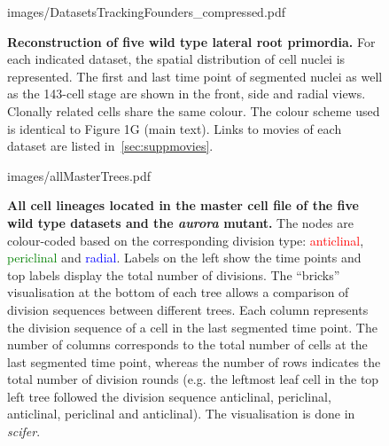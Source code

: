 \documentclass[11pt,a4paper, final]{article}
\begin{document}
%
%
\clearpage
\begin{figure}[htbp]
\centering
	\begin{overpic}[width=1.\linewidth]{images/DatasetsTrackingFounders_compressed.pdf}
	\end{overpic}
\caption[Reconstruction of five wild type lateral root primordia.]
{{\bf Reconstruction of five wild type lateral root primordia.} For each indicated dataset, the spatial distribution of cell nuclei is represented. The first and last time point of segmented nuclei as well as the 143-cell stage are shown in the front, side and radial views. Clonally related cells share the same colour. The colour scheme used is identical to Figure 1G (main text). Links to movies of each dataset are listed in~\ref{sec:suppmovies}.}
	\label{fig:trackingfounders}
\end{figure}
%
\clearpage
%
\begin{figure}[htbp]
\centering
		\begin{overpic}[width=.85\linewidth]{images/allMasterTrees.pdf}
		\end{overpic}
\caption[All cell lineages located in the master cell file of the five wild type datasets and the \emph{aurora} mutant.]
{
{\bf All cell lineages located in the master cell file of the five wild type datasets and the \emph{aurora} mutant.} The nodes are colour-coded based on the corresponding division type: \textcolor{red}{anticlinal}, \textcolor{green}{periclinal} and \textcolor{blue}{radial}. Labels on the left show the time points and top labels display the total number of divisions. The ``bricks'' visualisation at the bottom of each tree allows a comparison of division sequences between different trees. Each column represents the division sequence of a cell in the last segmented time point. The number of columns corresponds to the total number of cells at the last segmented time point, whereas the number of rows indicates the total number of division rounds (e.g. the leftmost leaf cell in the top left tree followed the division sequence anticlinal, periclinal, anticlinal, periclinal and anticlinal). The visualisation is done in \textit{scifer}.
}
	\label{fig:allMasterTrees}
\end{figure}
\end{document}
